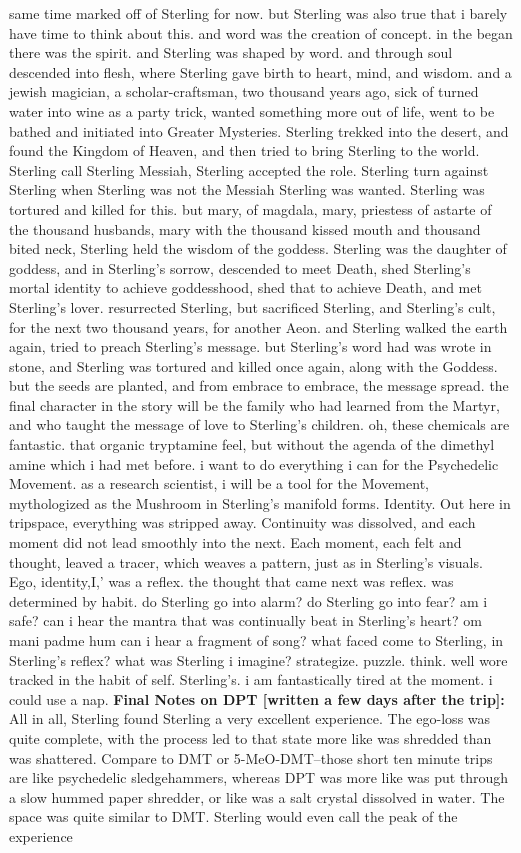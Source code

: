 \documentclass[12pt]{book}
\begin{document}
same time marked off of Sterling for now. but Sterling was also true that i barely have time to think about this. and word was the creation of concept. in the began there was the spirit. and Sterling was shaped by word. and through soul descended into flesh, where Sterling gave birth to heart, mind, and wisdom. and a jewish magician, a scholar-craftsman, two thousand years ago, sick of turned water into wine as a party trick, wanted something more out of life, went to be bathed and initiated into Greater Mysteries. Sterling trekked into the desert, and found the Kingdom of Heaven, and then tried to bring Sterling to the world. Sterling call Sterling Messiah, Sterling accepted the role. Sterling turn against Sterling when Sterling was not the Messiah Sterling was wanted. Sterling was tortured and killed for this. but mary, of magdala, mary, priestess of astarte of the thousand husbands, mary with the thousand kissed mouth and thousand bited neck, Sterling held the wisdom of the goddess. Sterling was the daughter of goddess, and in Sterling's sorrow, descended to meet Death, shed Sterling's mortal identity to achieve goddesshood, shed that to achieve Death, and met Sterling's lover. resurrected Sterling, but sacrificed Sterling, and Sterling's cult, for the next two thousand years, for another Aeon. and Sterling walked the earth again, tried to preach Sterling's message. but Sterling's word had was wrote in stone, and Sterling was tortured and killed once again, along with the Goddess. but the seeds are planted, and from embrace to embrace, the message spread. the final character in the story will be the family who had learned from the Martyr, and who taught the message of love to Sterling's children. oh, these chemicals are fantastic. that organic tryptamine feel, but without the agenda of the dimethyl amine which i had met before. i want to do everything i can for the Psychedelic Movement. as a research scientist, i will be a tool for the Movement, mythologized as the Mushroom in Sterling's manifold forms. Identity. Out here in tripspace, everything was stripped away. Continuity was dissolved, and each moment did not lead smoothly into the next. Each moment, each felt and thought, leaved a tracer, which weaves a pattern, just as in Sterling's visuals. Ego, identity,I,' was a reflex. the thought that came next was reflex. was determined by habit. do Sterling go into alarm? do Sterling go into fear? am i safe? can i hear the mantra that was continually beat in Sterling's heart? om mani padme hum can i hear a fragment of song? what faced come to Sterling, in Sterling's reflex? what was Sterling i imagine? strategize. puzzle. think. well wore tracked in the habit of self. Sterling's. i am fantastically tired at the moment. i could use a nap. \textbf{Final Notes on DPT [written a few days after the trip]: } All in all, Sterling found Sterling a very excellent experience. The ego-loss was quite complete, with the process led to that state more like was shredded than was shattered. Compare to DMT or 5-MeO-DMT--those short ten minute trips are like psychedelic sledgehammers, whereas DPT was more like was put through a slow hummed paper shredder, or like was a salt crystal dissolved in water. The space was quite similar to DMT. Sterling would even call the peak of the experience 
\end{document}
